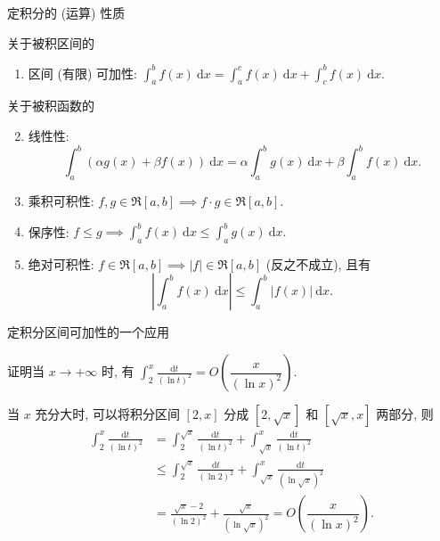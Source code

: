 \begin{frame}{定积分的 (运算) 性质}

关于被积区间的
\pause
\begin{enumerate}
\item 区间 (有限) 可加性: $\int_a^b f(x) ~ \mathrm{d} x = \int_a^c f(x) ~ \mathrm{d} x + \int_c^b f(x) ~ \mathrm{d} x.$
\end{enumerate}

\pause

关于被积函数的
\pause
\begin{enumerate}[<+->]
\setcounter{enumi}{1}
\item 线性性:
\[\int_a^b (\alpha g(x) + \beta f(x)) ~ \mathrm{d} x = \alpha \int_a^b g(x) ~ \mathrm{d} x + \beta \int_a^b f(x) ~ \mathrm{d} x.\]
\item 乘积可积性: $f, g \in \mathfrak{R}[a, b] \implies f \cdot g \in \mathfrak{R}[a, b].$
\item 保序性: $f \leqslant g \implies \int_a^b f(x) ~ \mathrm{d} x \leqslant \int_a^b g(x) ~ \mathrm{d} x.$
\item 绝对可积性: $f \in \mathfrak{R}[a, b] \implies \lvert f \rvert \in \mathfrak{R}[a, b]$ ({\color{red}反之不成立}), 且有
\[\left\lvert \int_a^b f(x) ~ \mathrm{d} x \right\rvert \leqslant \int_a^b \lvert f(x) \rvert ~ \mathrm{d} x.\]
\end{enumerate}

\end{frame}


\begin{frame}{定积分区间可加性的一个应用}

\begin{eg}
证明当 $x \to +\infty$ 时, 有 $\int_2^x \frac{\mathrm{d} t}{(\ln t)^2} = O\left(\dfrac{x}{(\ln x)^2}\right).$
\end{eg}

\pause
\vspace{1em}

\startproof[bg=yellow, fg=red]
当 $x$ 充分大时, 可以将积分区间 $[2, x]$ 分成 $[2, \sqrt{x}]$ 和 $[\sqrt{x}, x]$ 两部分, 则
\begin{align*}
\int_2^x \frac{\mathrm{d} t}{(\ln t)^2} & = \int_2^{\sqrt{x}} \frac{\mathrm{d} t}{(\ln t)^2} + \int_{\sqrt{x}}^x \frac{\mathrm{d} t}{(\ln t)^2} \\
& \leqslant \int_2^{\sqrt{x}} \frac{\mathrm{d} t}{(\ln 2)^2} + \int_{\sqrt{x}}^x \frac{\mathrm{d} t}{(\ln \sqrt{x})^2} \\
& = \frac{\sqrt{x}-2}{(\ln 2)^2} + \frac{\sqrt{x}}{(\ln \sqrt{x})^2} = O\left(\dfrac{x}{(\ln x)^2}\right).
\end{align*}

\end{frame}

